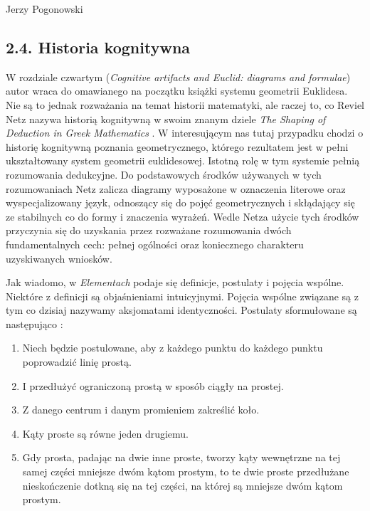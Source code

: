 \begin{newrevengenv}{Jerzy Pogonowski}
\subsection{2.4. Historia kognitywna}

W rozdziale czwartym ({\em Cognitive artifacts and Euclid:
diagrams and formulae}) autor wraca do omawianego na początku
książki systemu geometrii Euklidesa. Nie są to jednak rozważania
na temat historii matematyki, ale raczej to, co Reviel Netz nazywa
historią kognitywną w swoim znanym dziele {\em The Shaping of
Deduction in Greek Mathematics} \parencite{netz_shaping_1999}. W interesującym nas
tutaj przypadku chodzi o historię kognitywną poznania
geometrycznego, którego rezultatem jest w pełni ukształtowany
system geometrii euklidesowej. Istotną rolę w tym systemie pełnią
rozumowania dedukcyjne. Do podstawowych środków używanych w tych
rozumowaniach Netz zalicza diagramy wyposażone w oznaczenia
literowe oraz wyspecjalizowany język, odnoszący się do pojęć
geometrycznych i skłądający się ze stabilnych co do formy i
znaczenia wyrażeń. Wedle Netza użycie tych środków przyczynia się
do uzyskania przez rozważane rozumowania dwóch fundamentalnych
cech: pełnej ogólności oraz koniecznego charakteru uzyskiwanych
wniosków.

Jak wiadomo, w {\em Elementach} podaje się definicje, postulaty i
pojęcia wspólne. Niektóre z definicji są objaśnieniami
intuicyjnymi. Pojęcia wspólne związane są z tym co dzisiaj
nazywamy aksjomatami identyczności. Postulaty sformułowane są
następująco \parencite[s. 275]{euklides_elementy_2013}:

\begin{enumerate}

\item Niech będzie postulowane, aby z każdego punktu do każdego
punktu poprowadzić linię prostą.

\item I przedłużyć ograniczoną prostą w sposób ciągły na prostej.

\item Z danego centrum i danym promieniem zakreślić koło.

\item Kąty proste są równe jeden drugiemu.

\item Gdy prosta, padając na dwie inne proste, tworzy kąty
wewnętrzne na tej samej części mniejsze dwóm kątom prostym, to te
dwie proste przedłużane nieskończenie dotkną się na tej części, na
której są mniejsze dwóm kątom prostym.


\end{enumerate}
\end{newrevengenv}
